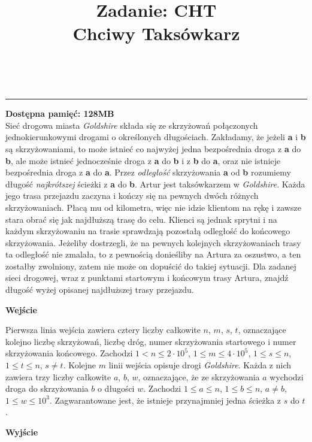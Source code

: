 \documentclass{article}
\makeatletter
\renewcommand{\maketitle}{\bgroup\setlength{\parindent}{0pt}
	\textbf{\@title}\egroup
	\\
}
\makeatother
\begin{document}
	\title{\large Zadanie: CHT \\ Chciwy Taksówkarz}\maketitle
	\centering \rule{18cm}{0.5pt} \justifying
	\textbf{Dostępna pamięć: 128MB} \\
	
	Sieć drogowa miasta \textit{Goldshire} składa się ze skrzyżowań połączonych jednokierunkowymi drogami o określonych długościach. Zakładamy, że jeżeli \textbf{a} i \textbf{b} są skrzyżowaniami, to może istnieć co najwyżej jedna bezpośrednia droga z \textbf{a} do \textbf{b}, ale może istnieć jednocześnie droga z \textbf{a} do \textbf{b} i z \textbf{b} do \textbf{a}, oraz nie istnieje bezpośrednia droga z \textbf{a} do \textbf{a}. Przez \textit{odległość} skrzyżowania \textbf{a} od \textbf{b} rozumiemy długość \textit{najkrótszej} ścieżki z \textbf{a} do \textbf{b}.
	\smallbreak
	Artur jest taksówkarzem w \textit{Goldshire}. Każda jego trasa przejazdu zaczyna i kończy się na pewnych dwóch różnych skrzyżowaniach. Płacą mu od kilometra, więc nie idzie klientom na rękę i zawsze stara obrać się jak najdłuższą trasę do celu. Klienci są jednak sprytni i na każdym skrzyżowaniu na trasie sprawdzają pozostałą odległość do końcowego skrzyżowania. Jeżeliby dostrzegli, że na pewnych kolejnych skrzyżowaniach trasy ta odległość nie zmalała, to z pewnością donieśliby na Artura za oszustwo, a ten zostałby zwolniony, zatem nie może on dopuścić do takiej sytuacji.
	\smallbreak
	Dla zadanej sieci drogowej, wraz z punktami startowym i końcowym trasy Artura, znajdź długość wyżej opisanej najdłuższej trasy przejazdu.
	\begin{flushleft}
		\LARGE \textbf{Wejście}
	\end{flushleft}
	\smallbreak
	
	Pierwsza linia wejścia zawiera cztery liczby całkowite $n$, $m$, $s$, $t$, oznaczające kolejno liczbę skrzyżowań, liczbę dróg, numer skrzyżowania startowego i numer skrzyżowania końcowego. Zachodzi $1 < n \leq 2 \cdot 10^5$, $1 \leq m \leq 4 \cdot 10^5$, $1 \leq s \leq n$, $1 \leq t \leq n$, $s \neq t$.
	\smallbreak
	Kolejne $m$ linii wejścia opisuje drogi \textit{Goldshire}. Każda z nich zawiera trzy liczby całkowite $a$, $b$, $w$, oznaczające, że ze skrzyżowania $a$ wychodzi droga do skrzyżowania $b$ o długości $w$. Zachodzi $1 \leq a \leq n$, $1 \leq b \leq n$, $a \neq b$, $1 \leq w \leq 10^3$.
	\smallbreak
	Zagwarantowane jest, że istnieje przynajmniej jedna ścieżka z $s$ do $t$.
	\begin{flushleft}
		\LARGE \textbf{Wyjście}
	\end{flushleft}
	\smallbreak
	
\end{document}
